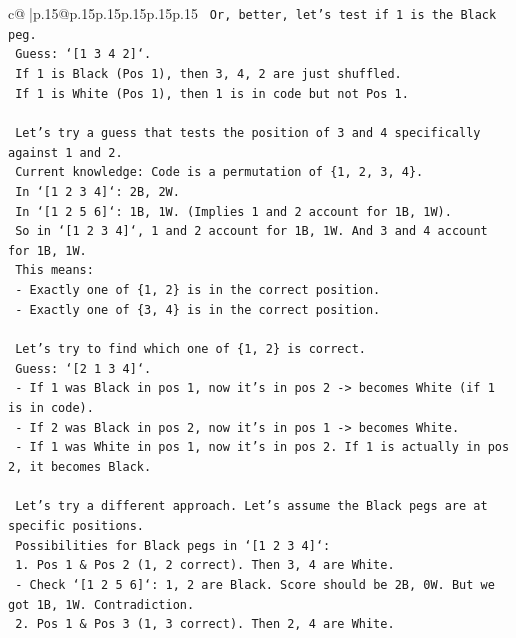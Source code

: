\documentclass{article}
\begin{document}
{\begin{supertabular}{c@{$\;$}|p{.15\linewidth}@{}p{.15\linewidth}p{.15\linewidth}p{.15\linewidth}p{.15\linewidth}p{.15\linewidth}}
{{{\texttt{    Or, better, let's test if 1 is the Black peg.} \\
\texttt{    Guess: `{[}1 3 4 2{]}`.} \\
\texttt{    If 1 is Black (Pos 1), then 3, 4, 2 are just shuffled.} \\
\texttt{    If 1 is White (Pos 1), then 1 is in code but not Pos 1.} \\
\\ 
\texttt{    Let's try a guess that tests the position of 3 and 4 specifically against 1 and 2.} \\
\texttt{    Current knowledge: Code is a permutation of \{1, 2, 3, 4\}.} \\
\texttt{    In `{[}1 2 3 4{]}`: 2B, 2W.} \\
\texttt{    In `{[}1 2 5 6{]}`: 1B, 1W. (Implies 1 and 2 account for 1B, 1W).} \\
\texttt{    So in `{[}1 2 3 4{]}`, 1 and 2 account for 1B, 1W. And 3 and 4 account for 1B, 1W.} \\
\texttt{    This means:} \\
\texttt{    {-} Exactly one of \{1, 2\} is in the correct position.} \\
\texttt{    {-} Exactly one of \{3, 4\} is in the correct position.} \\
\\ 
\texttt{    Let's try to find which one of \{1, 2\} is correct.} \\
\texttt{    Guess: `{[}2 1 3 4{]}`.} \\
\texttt{    {-} If 1 was Black in pos 1, now it's in pos 2 {-}> becomes White (if 1 is in code).} \\
\texttt{    {-} If 2 was Black in pos 2, now it's in pos 1 {-}> becomes White.} \\
\texttt{    {-} If 1 was White in pos 1, now it's in pos 2. If 1 is actually in pos 2, it becomes Black.} \\
\\ 
\texttt{    Let's try a different approach. Let's assume the Black pegs are at specific positions.} \\
\texttt{    Possibilities for Black pegs in `{[}1 2 3 4{]}`:} \\
\texttt{    1. Pos 1 \& Pos 2 (1, 2 correct). Then 3, 4 are White.} \\
\texttt{       {-} Check `{[}1 2 5 6{]}`: 1, 2 are Black. Score should be 2B, 0W. But we got 1B, 1W. Contradiction.} \\
\texttt{    2. Pos 1 \& Pos 3 (1, 3 correct). Then 2, 4 are White.} \\
}}}
\end{supertabular}}
\end{document}

